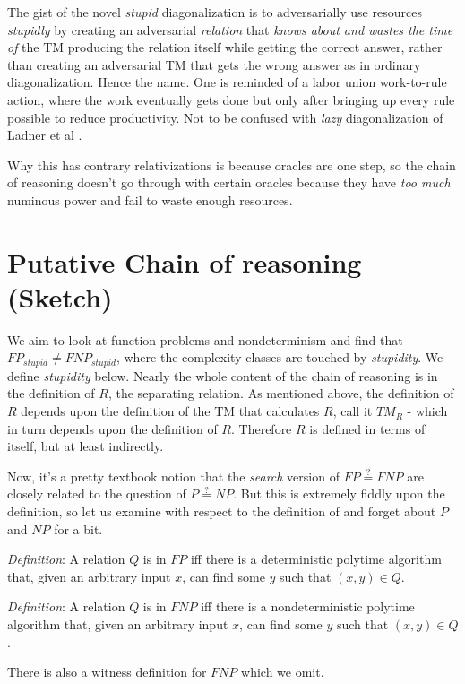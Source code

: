 \documentclass{article}
\begin{document}
The gist of the novel \textit{stupid} diagonalization is to adversarially use resources \textit{stupidly} by creating an adversarial \textit{relation} that \textit{knows about and wastes the time of} the TM producing the relation itself while getting the correct answer, rather than creating an adversarial TM that gets the wrong answer as in ordinary diagonalization. Hence the name. One is reminded of a labor union work-to-rule action, where the work eventually gets done but only after bringing up every rule possible to reduce productivity. Not to be confused with \textit{lazy} diagonalization of Ladner et al \cite{ladner}.

Why this has contrary relativizations is because oracles are one step, so the chain of reasoning doesn't go through with certain oracles because they have \textit{too much} numinous power and fail to waste enough resources.

\section{Putative Chain of reasoning (Sketch)}

We aim to look at function problems and nondeterminism and find that $FP_{stupid} \neq FNP_{stupid}$, where the complexity classes are touched by \textit{stupidity}. We define \textit{stupidity} below. Nearly the whole content of the chain of reasoning is in the definition of $R$, the separating relation. As mentioned above, the definition of $R$ depends upon the definition of the TM that calculates $R$, call it $TM_R$ - which in turn depends upon the definition of $R$. Therefore $R$ is defined in terms of itself, but at least indirectly.

Now, it's a pretty textbook notion \cite{papadimitriou} that the \textit{search} version of $FP \stackrel{?}{=} FNP$ are closely related to the question of $P \stackrel{?}{=} NP$. But this is extremely fiddly upon the definition, so let us examine with respect to the definition of \cite{rich} and forget about $P$ and $NP$ for a bit.

\textit{Definition}: A relation $Q$ is in $FP$ iff there is a deterministic polytime algorithm that, given an arbitrary input $x$, can find some $y$ such that $(x, y) \in Q$.

\textit{Definition}: A relation $Q$ is in $FNP$ iff there is a nondeterministic polytime algorithm that, given an arbitrary input $x$, can find some $y$ such that $(x, y) \in Q$.

There is also a witness definition for $FNP$ which we omit.
\end{document}
